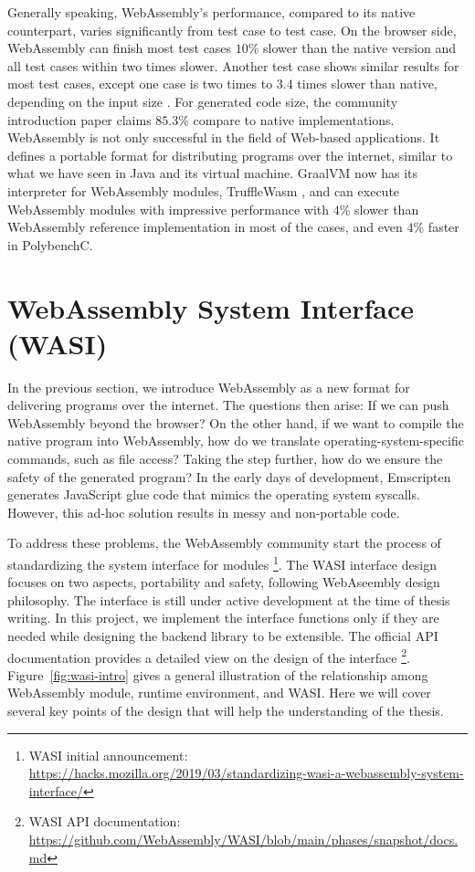 Generally speaking, WebAssembly's performance, compared to its native
counterpart, varies significantly from test case to test case. On the browser
side, WebAssembly can finish most test cases $10\%$ slower than the native
version and all test cases within two times slower. Another test case shows
similar results for most test cases, except one case is two times to $3.4$ times
slower than native, depending on the input size \cite{234914}. For generated
code size, the community introduction paper claims $85.3\%$ compare to native
implementations. WebAssembly is not only successful in the field of Web-based
applications. It defines a portable format for distributing programs over the
internet, similar to what we have seen in Java and its virtual machine. GraalVM
now has its interpreter for WebAssembly modules, TruffleWasm \cite{trufflewasm},
and can execute WebAssembly modules with impressive performance with $4\%$
slower than WebAssembly reference implementation in most of the cases, and even
$4\%$ faster in PolybenchC.

\section{WebAssembly System Interface (WASI)}

In the previous section, we introduce WebAssembly as a new format for delivering
programs over the internet. The questions then arise: If we can push WebAssembly
beyond the browser? On the other hand, if we want to compile the native program
into WebAssembly, how do we translate operating-system-specific commands, such
as file access? Taking the step further, how do we ensure the safety of the
generated program? In the early days of development, Emscripten generates
JavaScript glue code that mimics the operating system syscalls. However, this
ad-hoc solution results in messy and non-portable code.

To address these problems, the WebAssembly community start the process of
standardizing the system interface for modules
\footnote{WASI initial announcement:
\\\url{https://hacks.mozilla.org/2019/03/standardizing-wasi-a-webassembly-system-interface/}}.
The WASI interface design focuses on two aspects, portability and safety,
following WebAseembly design philosophy.  The interface is still under active
development at the time of thesis writing. In this project, we implement the
interface functions only if they are needed while designing the backend library
to be extensible.  The official API documentation provides a detailed view on
the design of the interface \footnote{WASI API documentation:
\\\url{https://github.com/WebAssembly/WASI/blob/main/phases/snapshot/docs.md}}.
Figure~\ref{fig:wasi-intro} gives a general illustration of the relationship
among WebAssembly module, runtime environment, and WASI.  Here we will cover
several key points of the design that will help the understanding of the thesis.

